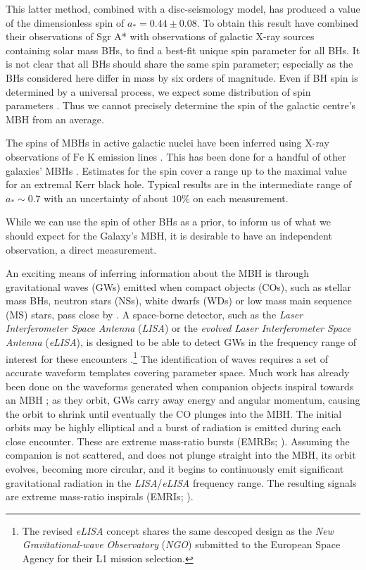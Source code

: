 \documentclass[useAMS,usedcolumn,usegraphicx,usenatbib]{mn2e}
\begin{document}
This latter method, combined with a disc-seismology model, has produced a value of the dimensionless spin of $a_\ast = 0.44 \pm 0.08$. To obtain this result \citet{Kato2010} have combined their observations of Sgr A* with observations of galactic X-ray sources containing solar mass BHs, to find a best-fit unique spin parameter for all BHs. It is not clear that all BHs should share the same spin parameter; especially as the BHs considered here differ in mass by six orders of magnitude. Even if BH spin is determined by a universal process, we expect some distribution of spin parameters \citep*{King2008, Berti2008}. Thus we cannot precisely determine the spin of the galactic centre's MBH from an average.

The spins of MBHs in active galactic nuclei have been inferred using X-ray observations of $\mathrm{Fe}$ $\mathrm{K}$ emission lines \citep{Miller2007, McClintock2011}. This has been done for a handful of other galaxies' MBHs \citep{Brenneman2006, Miniutti2009, Schmoll2009, delaCallePerez2010, Zoghbi2010, Nardini2011,  Patrick2011}. Estimates for the spin cover a range up to the maximal value for an extremal Kerr black hole. Typical results are in the intermediate range of $a_\ast \sim 0.7$ with an uncertainty of about $10\%$ on each measurement.

While we can use the spin of other BHs as a prior, to inform us of what we should expect for the Galaxy's MBH, it is desirable to have an independent observation, a direct measurement.

An exciting means of inferring information about the MBH is through gravitational waves (GWs) emitted when compact objects (COs), such as stellar mass BHs, neutron stars (NSs), white dwarfs (WDs) or low mass main sequence (MS) stars, pass close by \citep{Sathyaprakash2009}. A space-borne detector, such as the \textit{Laser Interferometer Space Antenna} (\textit{LISA}) or the \textit{evolved Laser Interferometer Space Antenna} (\textit{eLISA}), is designed to be able to detect GWs in the frequency range of interest for these encounters \citep{Bender1998, Danzmann2003, Jennrich2011, Amaro-Seoane2012a}.\footnote{The revised \textit{eLISA} concept shares the same descoped design as the \textit{New Gravitational-wave Observatory} (\textit{NGO}) submitted to the European Space Agency for their L1 mission selection.} The identification of waves requires a set of accurate waveform templates covering parameter space. Much work has already been done on the waveforms generated when companion objects inspiral towards an MBH \citep{Glampedakis2005, Barack2009}; as they orbit, GWs carry away energy and angular momentum, causing the orbit to shrink until eventually the CO plunges into the MBH. The initial orbits may be highly elliptical and a burst of radiation is emitted during each close encounter. These are extreme mass-ratio bursts (EMRBs; \citealt*{Rubbo2006}). Assuming the companion is not scattered, and does not plunge straight into the MBH, its orbit evolves, becoming more circular, and it begins to continuously emit significant gravitational radiation in the \textit{LISA}/\textit{eLISA} frequency range. The resulting signals are extreme mass-ratio inspirals (EMRIs; \citealt{Amaro-Seoane2007, Amaro-Seoane2012c}).
\end{document}
